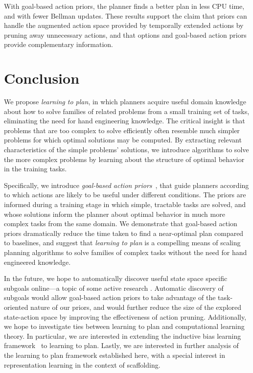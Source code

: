 \documentclass[11pt]{article}
\begin{document}
With goal-based action priors, the planner finds a better plan in less CPU time,
and with fewer Bellman updates. These results support the claim that
priors can handle the augmented action space provided by
temporally extended actions by pruning away unnecessary actions, and
that options and goal-based action priors provide complementary information.


\section{Conclusion}

We propose {\it learning to plan}, in which planners acquire useful domain knowledge about how to solve families of related problems from a small training set of tasks, eliminating the need for hand engineering knowledge. The critical insight is that problems that are too complex to solve efficiently often resemble much simpler problems for which optimal solutions may be computed. By extracting relevant characteristics of the simple problems' solutions, we introduce algorithms to solve the more complex problems by learning about the structure of optimal behavior in the training tasks.

Specifically, we introduce {\it goal-based action priors}~\cite{abel2015goal}, that guide planners according to which actions are likely to be useful under different conditions. The priors are informed during a training stage in which simple, tractable tasks are solved, and whose solutions inform the planner about optimal behavior in much more complex tasks from the same domain. We demonstrate that goal-based action priors dramatically reduce the time taken to find a near-optimal plan compared to baselines, and suggest that {\it learning to plan} is a compelling means of scaling planning algorithms to solve families of complex tasks without the need for hand engineered knowledge.

In the future, we hope to automatically discover useful state space
specific subgoals online---a topic of some active research
\cite{Mcgovern01automaticdiscovery,Simsek:2005:IUS:1102351.1102454}.
Automatic discovery of subgoals would allow goal-based action priors
to take advantage of the task-oriented nature of our priors, and would
further reduce the size of the explored state-action space by
improving the effectiveness of action pruning. Additionally, we hope to investigate ties between learning to plan and computational learning theory. In particular, we are interested in extending the inductive bias learning framework~\cite{baxter2000model} to learning to plan. Lastly, we are interested in further analysis of the learning to plan framework established here, with a special interest in representation learning in the context of scaffolding.




\end{document}
